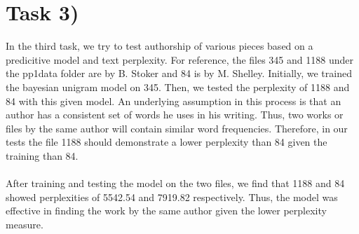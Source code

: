 \documentclass{article}
\begin{document}
\section*{Task 3)}

In the third task, we try to test authorship of various pieces based on a predicitive model and text perplexity. For reference, the files 345 and 1188 under the pp1data folder are by B. Stoker and 84 is by M. Shelley. Initially, we trained the bayesian unigram model on 345. Then, we tested the perplexity of 1188 and 84 with this given model. An underlying assumption in this process is that an author has a consistent set of words he uses in his writing. Thus, two works or files by the same author will contain similar word frequencies. Therefore, in our tests the file 1188 should demonstrate a lower perplexity than 84 given the training than 84. 
\\ \\
After training and testing the model on the two files, we find that 1188 and 84 showed perplexities of 5542.54 and 7919.82 respectively. Thus, the model was effective in finding the work by the same author given the lower perplexity measure. 
\end{document}
